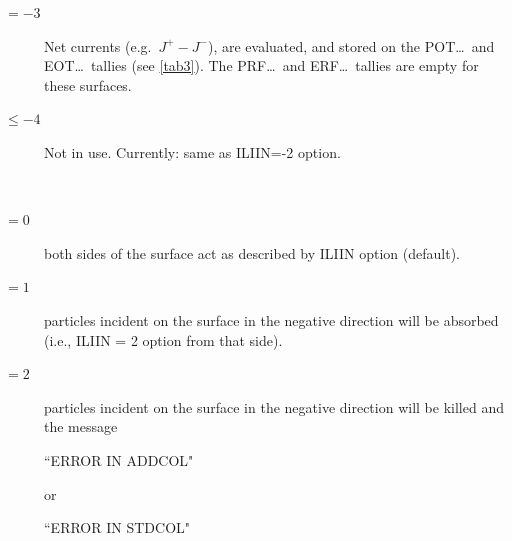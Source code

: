 \begin{description}
\begin{description}
\begin{description}
                  \item[$= -3$] Net currents (e.g.\ $J^+ - J^-$), are evaluated, and stored on
                        the POT\dots\ and EOT\dots\ tallies (see \cref{tab3}).
                        The PRF\dots\ and ERF\dots\ tallies are empty for these surfaces.
                  \item[$\leq -4$] Not in use.
                        Currently: same as ILIIN=-2 option.
                \end{description}
        \end{description}
  \item[ILSIDE] ~
        \begin{description}
          \item[$= 0$] both sides of the surface act
                as described by ILIIN option (default).
          \item[$= 1$] particles incident on the surface in the negative direction will
                be absorbed (i.e., ILIIN = 2 option from that side).
          \item[$= 2$] particles incident on the surface in the negative direction will
                be killed and the message 

                ``ERROR IN ADDCOL" 

                or 

                ``ERROR IN STDCOL" 


\end{description}
\end{description}

